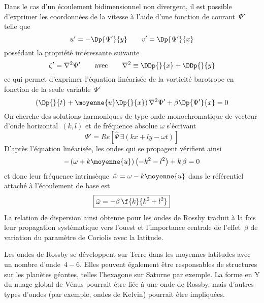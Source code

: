 \sk
Dans le cas d'un écoulement bidimensionnel non divergent,
il est possible d'exprimer les coordonnées de la vitesse
à l'aide d'une fonction de courant~$\Psi'$ telle que
\[
u' = - \Dp{\Psi'}{y} \qquad v' = \Dp{\Psi'}{x}
\]
\noindent possédant la propriété intéressante suivante
\[
\zeta' = \nabla^2 \Psi'
\qquad
\textrm{avec}
\qquad
\nabla^2 \equiv \DDp{}{x} + \DDp{}{y}
\]
\noindent ce qui permet d'exprimer l'équation linéarisée de la vorticité barotrope
en fonction de la seule variable~$\Psi'$
\[
\left( \Dp{}{t} + \moyenne{u} \Dp{}{x} \right) \nabla^2 \Psi' + \beta \Dp{\Psi'}{x} = 0
\]
\noindent On cherche des solutions harmoniques 
de type onde monochromatique 
de vecteur d'onde horizontal~$(k,l)$ 
et de fréquence absolue $\omega$
s'écrivant
\[
\Psi' = Re \left[ \hat{\Psi} \, \exi{(kx+ly-\omega t)} \right]
\]
\noindent D'après l'équation linéarisée, les ondes
qui se propagent vérifient ainsi
\[
- \left( \omega + k \moyenne{u} \right) \left( - k^2 - l^2 \right) + k\,\beta = 0
\]
et donc leur fréquence intrinsèque~$\tilde{\omega} = \omega - k\moyenne{u}$ 
dans le référentiel attaché à l'écoulement de base est
\[
\boxed{
\tilde{\omega} = - \beta \, \f{k}{k^2+l^2}
}
\]
\noindent La relation de dispersion ainsi obtenue pour
les ondes de Rossby traduit à la fois leur
propagation systématique vers l'ouest
et l'importance centrale de l'effet~$\beta$ 
de variation du paramètre de Coriolis avec la latitude.


\sk
Les ondes de Rossby se développent sur Terre
dans les moyennes latitudes avec un nombre d'onde~$4-6$.
Elles peuvent également être responsables de structures 
sur les planètes géantes, telles l'hexagone sur Saturne par exemple.
La forme en Y du nuage global de Vénus pourrait être liée
à une onde de Rossby, mais d'autres types d'ondes 
(par exemple, ondes de Kelvin) pourrait être impliquées.
